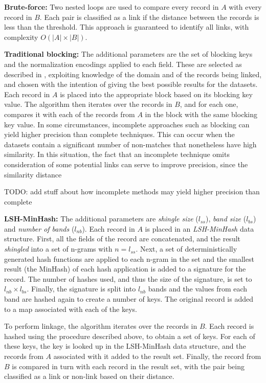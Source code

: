 \documentclass{llncs}
\begin{document}
\textbf{Brute-force:}
Two nested loops are used to compare every record in $A$ with every
record in $B$. Each pair is classified as a link if the distance between
the records is less than the threshold. This approach is guaranteed to
identify all links, with complexity $ O(|A| \times |B|) $.

\textbf{Traditional blocking:}
The additional parameters are the set of blocking keys and the
normalization encodings applied to each field. These are selected as
described in \cite{Chr12b}, exploiting knowledge of the domain and of
the records being linked, and chosen with the intention of giving the
best possible results for the datasets.
Each record in $A$ is placed into the appropriate block based on its
blocking key value. The algorithm then iterates over the records in $B$,
and for each one, compares it with each of the records from $A$ in the
block with the same blocking key value.
In some circumstances, incomplete approaches such as blocking can yield
higher precision than complete techniques. This can occur when the
datasets contain a significant number
of non-matches that nonetheless have high similarity. In this situation,
the fact that an incomplete technique omits consideration of some
potential links can serve to improve precision, since the similarity
distance 

TODO: add stuff about how incomplete methods may yield higher precision than complete



\textbf{LSH-MinHash:}
The additional parameters are \emph{shingle size} ($l_{ss}$), \emph{band
size} ($l_{bs}$) and \emph{number of bands} ($l_{nb}$). Each record in
$A$ is placed in an \emph{LSH-MinHash} data structure. First, all the
fields of the record are concatenated, and the result \emph{shingled}
into a set of n-grams with $n = l_{ss}$. Next, a set of
deterministically generated hash functions are applied to each n-gram in
the set and the smallest result (the MinHash) of each hash application
is added to a signature for the record. The number of hashes used, and
thus the size of the signature, is set to $l_{nb} \times l_{bs}$.
Finally, the signature is split into $l_{nb}$ bands and the values from
each band are hashed again to create a number of keys. The original
record is added to a map associated with each of the keys. 

To perform linkage, the algorithm iterates over the records in $B$. Each
record is hashed using the procedure described above, to obtain a set of
keys. For each of these keys, the key is looked up in the LSH-MinHash
data structure, and the records from $A$ associated with it added to the
result set. Finally, the record from $B$ is compared in turn with each
record in the result set, with the pair being classified as a link or
non-link based on their distance.
\end{document}
